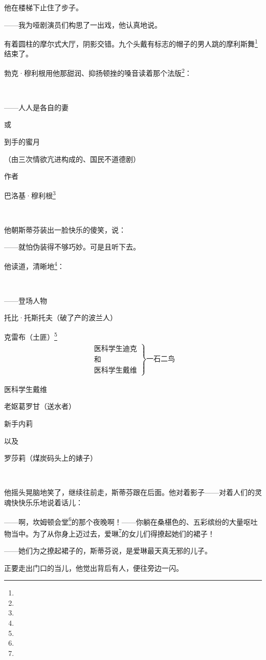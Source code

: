 \par 他在楼梯下止住了步子。
\par ——我为哑剧演员们构思了一出戏，他认真地说。
\par 有着圆柱的摩尔式大厅，阴影交错。九个头戴有标志的帽子的男人跳的摩利斯舞\footnote{}结束了。
\par 勃克·穆利根用他那甜润、抑扬顿挫的嗓音读着那个法版\footnote{}：
\par  
\par ——人人是各自的妻
\par 或
\par 到手的蜜月
\par （由三次情欲亢进构成的、国民不道德剧）
\par 作者
\par 巴洛基·穆利根\footnote{}
\par  
\par 他朝斯蒂芬装出一脸快乐的傻笑，说：
\par ——就怕伪装得不够巧妙。可是且听下去。
\par 他读道，清晰地\footnote{}：
\par  
\par ——登场人物
\par 托比·托斯托夫（破了产的波兰人）
\par 克雷布（土匪）\footnote{}
\begin{gather*}
    \left.
        \begin{matrix}
            \text{医科学生迪克}\\
            \text{和}\\
            \text{医科学生戴维}
        \end{matrix}
    \right\} \text{一石二鸟}
\end{gather*}
\par 医科学生戴维
\par 老妪葛罗甘（送水者）
\par 新手内莉
\par 以及
\par 罗莎莉（煤炭码头上的婊子）
\par  
\par 他摇头晃脑地笑了，继续往前走，斯蒂芬跟在后面。他对着影子——对着人们的灵魂快快乐乐地说着话儿：
\par ——啊，坎姆顿会堂\footnote{}的那个夜晚啊！——你躺在桑椹色的、五彩缤纷的大量呕吐物当中。为了从你身上迈过去，爱琳\footnote{}的女儿们得撩起她们的裙子！
\par ——她们为之撩起裙子的，斯蒂芬说，是爱琳最天真无邪的儿子。
\par 正要走出门口的当儿，他觉出背后有人，便往旁边一闪。
